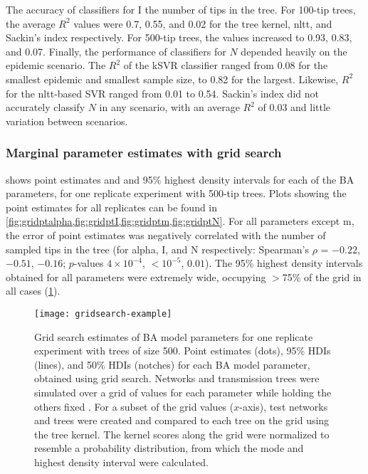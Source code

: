 The accuracy of classifiers for \gls{I}  the number of tips in the
tree. For 100-tip trees, the average $R^2$ values were
  0.7,
  0.55, and
  0.02
for the tree kernel, \gls{nltt}, and Sackin's index respectively. For 500-tip
trees, the values increased to
  0.93,
  0.83, and
  0.07.
Finally, the performance of classifiers for $N$ depended heavily on the
epidemic scenario. The $R^2$ of the \gls{kSVR} classifier ranged from
  0.08
for the smallest epidemic and smallest sample size, to
  0.82
for the largest. Likewise, $R^2$ for the \gls{nltt}-based SVR ranged from 
  0.01
to
  0.54.
Sackin's index did not accurately classify $N$ in any scenario, with an average
$R^2$ of
  0.03
and little variation between scenarios.

\subsubsection*{Marginal parameter estimates with grid search}



  shows point estimates and
 and 95\% highest density intervals for each of the \gls{BA}
parameters, for one replicate experiment with 500-tip trees. Plots showing the
point estimates for all replicates can be found in
\cref{fig:gridptalpha,fig:gridptI,fig:gridptm,fig:gridptN}. For all parameters
except \gls{m}, the error of point estimates was negatively correlated with the
number of sampled tips in the tree (for \gls{alpha}, \gls{I}, and \gls{N}
respectively: Spearman's $\rho$ = 
    \ensuremath{-0.22},
    \ensuremath{-0.51}, 
    \ensuremath{-0.16}; 
$p$-values
    $4\!\times\!10^{-4}$,
    ${<}10^{-5}$,
    $0.01$).
The 95\% highest density intervals obtained for all parameters were extremely
wide, occupying $>$75\% of the grid in all cases (\cref{fig:gridest}).

\begin{figure}[ht]
    \centering
    \texttt{[image: gridsearch-example]}
    \caption[
        Grid search estimates of \gls{BA} model parameters for one replicate
        experiment with trees of size 500.
    ]{
        Grid search estimates of \gls{BA} model parameters for one replicate
        experiment with trees of size 500. Point estimates (dots), 95\%
        \glspl{HDI} (lines), and 50\% \glspl{HDI} (notches) for each \gls{BA}
        model parameter, obtained using grid search. Networks and transmission
        trees were simulated over a grid of values for each parameter while
        holding the others fixed . For a subset of the
        grid values ($x$-axis), test networks and trees were created and
        compared to each tree on the grid using the tree kernel. The kernel
        scores along the grid were normalized to resemble a probability
        distribution, from which the mode and highest density interval were
        calculated.
    } 
    \label{fig:gridest}
\end{figure}

